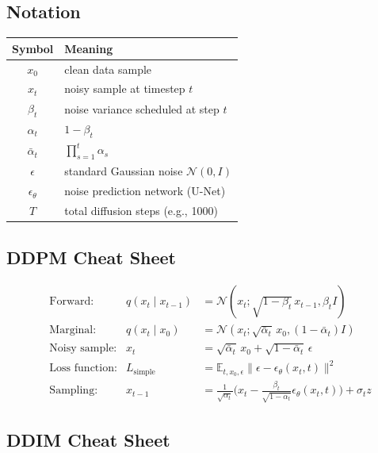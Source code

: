 \documentclass[11pt,a4paper]{article}
\theoremstyle{definition}
\newcommand{\E}{\mathbb{E}}
\newcommand{\N}{\mathcal{N}}          %
\newcommand{\alphat}{\bar{\alpha}_t}
\begin{document}
\subsection*{Notation}

\begin{center}
\begin{tabular}{c|l}
    \toprule
    Symbol & Meaning \\
    \midrule
    $x_0$ & clean data sample \\
    $x_t$ & noisy sample at timestep $t$ \\
    $\beta_t$ & noise variance scheduled at step $t$ \\
    $\alpha_t$ & $1 - \beta_t$ \\
    $\alphat$ & $\prod_{s=1}^{t} \alpha_s$ \\
    $\epsilon$ & standard Gaussian noise $\N(0, I)$ \\
    $\epsilon_\theta$ & noise prediction network (U-Net) \\
    $T$ & total diffusion steps (e.g., 1000) \\
    \bottomrule
\end{tabular}
\end{center}

\subsection*{DDPM Cheat Sheet}

\begin{align}
    &\text{Forward:}         & q(x_t \mid x_{t-1}) &= \N(x_t; \sqrt{1-\beta_t}\,x_{t-1}, \beta_t I) \\[4pt]
    &\text{Marginal:}        & q(x_t \mid x_0)     &= \N(x_t; \sqrt{\alphat}\,x_0, (1-\alphat)I) \\[4pt]
    &\text{Noisy sample:}    & x_t                  &= \sqrt{\alphat}\,x_0 + \sqrt{1-\alphat}\,\epsilon \\[4pt]
    &\text{Loss function:}   & L_{\text{simple}}    &= \E_{t,x_0,\epsilon}\big\| \epsilon - \epsilon_\theta(x_t, t) \big\|^2 \\[4pt]
    &\text{Sampling:}        & x_{t-1}              &= \frac{1}{\sqrt{\alpha_t}}\big(x_t - \frac{\beta_t}{\sqrt{1-\alphat}}\epsilon_\theta(x_t,t)\big) + \sigma_t z
\end{align}

\subsection*{DDIM Cheat Sheet}
\end{document}
